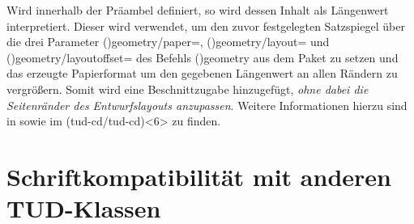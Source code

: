 \begin{DeclareEntity}{}
\begin{Declaration}
  {}
\printdeclarationlist

Wird  innerhalb der Präambel definiert, so wird dessen 
Inhalt als Längenwert interpretiert. Dieser wird verwendet, um den zuvor 
festgelegten Satzspiegel über die drei Parameter
\Macro*(){geometry/paper=},
\Macro*(){geometry/layout=} und 
\Macro*(){geometry/layoutoffset=\PLength} 
des Befehls \Macro*(){geometry} aus dem Paket 
 zu setzen und das erzeugte Papierformat um den gegebenen 
Längenwert an allen Rändern zu vergrößern. Somit wird eine Beschnittzugabe 
hinzugefügt, \emph{ohne dabei die Seitenränder des Entwurfslayouts anzupassen}. 
Weitere Informationen hierzu sind in  sowie im 
\GitHubRepo(tud-cd/tud-cd)<6> zu finden.
\end{Declaration}
%
\end{DeclareEntity}



\section[%
  Das Paket \Package{fix-tudscrfonts} -- Schriftkompatibilität%
]{%
  Schriftkompatibilität mit anderen TUD-Klassen%
}

